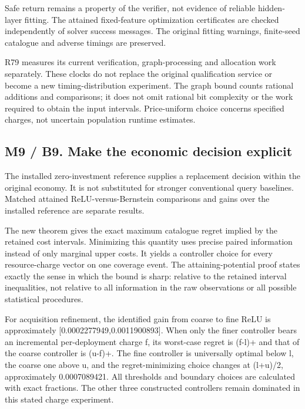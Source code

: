 \documentclass[ecta,nameyear,draft]{econsocart}
\begin{document}
Safe return remains a property of the verifier, not evidence of reliable
hidden-layer fitting. The attained fixed-feature optimization
certificates are checked independently of solver success messages. The
original fitting warnings, finite-seed catalogue and adverse timings are
preserved.

R79 measures its current verification, graph-processing and allocation
work separately. These clocks do not replace the original qualification
service or become a new timing-distribution experiment. The graph bound
counts rational additions and comparisons; it does not omit rational bit
complexity or the work required to obtain the input intervals.
Price-uniform choice concerns specified charges, not uncertain
population runtime estimates.

\hypertarget{m9-b9.-make-the-economic-decision-explicit}{%
\subsection{M9 / B9. Make the economic decision
explicit}\label{m9-b9.-make-the-economic-decision-explicit}}

The installed zero-investment reference supplies a replacement decision
within the original economy. It is not substituted for stronger
conventional query baselines. Matched attained ReLU-versus-Bernstein
comparisons and gains over the installed reference are separate results.

The new theorem gives the exact maximum catalogue regret implied by the
retained cost intervals. Minimizing this quantity uses precise paired
information instead of only marginal upper costs. It yields a controller
choice for every resource-charge vector on one coverage event. The
attaining-potential proof states exactly the sense in which the bound is
sharp: relative to the retained interval inequalities, not relative to
all information in the raw observations or all possible statistical
procedures.

For acquisition refinement, the identified gain from coarse to fine ReLU
is approximately {[}0.0002277949,0.0011900893{]}. When only the finer
controller bears an incremental per-deployment charge f, its worst-case
regret is (f-l)+ and that of the coarse controller is (u-f)+. The fine
controller is universally optimal below l, the coarse one above u, and
the regret-minimizing choice changes at (l+u)/2, approximately
0.0007089421. All thresholds and boundary choices are calculated with
exact fractions. The other three constructed controllers remain
dominated in this stated charge experiment.
\end{document}
